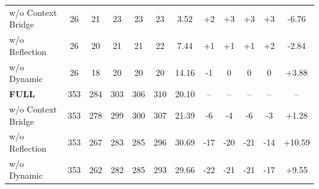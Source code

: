 \begin{table}[t]
{\begin{tabular}{@{}lccccccccccc@{}}
w/o Context Bridge & 26 & 21 & 23 & 23 & 23 & 3.52 & +2 & +3 & +3 & +3 & -6.76 \\
w/o Reflection & 26 & 20 & 21 & 21 & 22 & 7.44 & +1 & +1 & +1 & +2 & -2.84 \\
w/o Dynamic & 26 & 18 & 20 & 20 & 20 & 14.16 & -1 & 0 & 0 & 0 & +3.88 \\
\midrule
\textbf{FULL} & 353 & 284 & 303 & 306 & 310 & 20.10 & -- & -- & -- & -- & -- \\
w/o Context Bridge & 353 & 278 & 299 & 300 & 307 & 21.39 & -6 & -4 & -6 & -3 & +1.28 \\
w/o Reflection & 353 & 267 & 283 & 285 & 296 & 30.69 & -17 & -20 & -21 & -14 & +10.59 \\
w/o Dynamic & 353 & 262 & 282 & 285 & 293 & 29.66 & -22 & -21 & -21 & -17 & +9.55 \\
\bottomrule
\end{tabular}%
}
\end{table}
